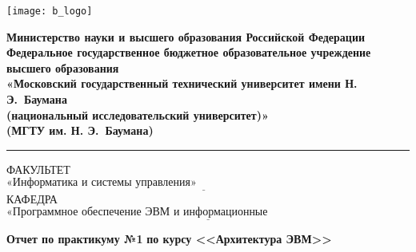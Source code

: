 \begin{titlepage}
	\fontsize{12pt}{12pt}\selectfont
	\noindent \begin{minipage}{0.15\textwidth}
		\texttt{[image: b\_logo]}
	\end{minipage}
	\noindent\begin{minipage}{0.9\textwidth}\centering
		\textbf{Министерство науки и высшего образования Российской Федерации}\\
		\textbf{Федеральное государственное бюджетное образовательное учреждение высшего образования}\\
		\textbf{«Московский государственный технический университет имени Н. Э.~Баумана}\\
		\textbf{(национальный исследовательский университет)»}\\
		\textbf{(МГТУ им. Н. Э.~Баумана)}
	\end{minipage}
	
	\noindent\rule{18cm}{3pt}
	\newline\newline
	\noindent ФАКУЛЬТЕТ $\underline{\text{«Информатика и системы управления»~~~~~~~~~~~~~~~~~~~~~~~~~~~~~~~~~~~~~~~~~~~~~~~~~~~~~~~}}$ \newline\newline
	\noindent КАФЕДРА $\underline{\text{«Программное обеспечение ЭВМ и информационные технологии»~~~~~~~~~~~~~~~~~~~~~~~}}$\newline\newline\newline\newline\newline\newline\newline
	
	
	\begin{center}
		\Large\textbf{Отчет по практикуму №1}
		\Large\textbf{по курсу <<Архитектура ЭВМ>>}
		
	\end{center}
	

\end{titlepage}
